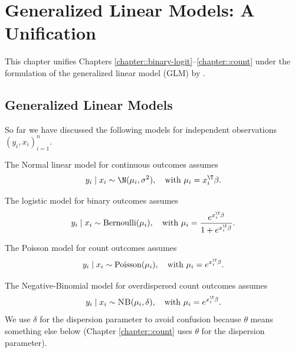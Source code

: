  
\chapter{Generalized Linear Models: A Unification}


This chapter unifies Chapters \ref{chapter::binary-logit}--\ref{chapter::count} under the formulation of the generalized linear model (GLM) by \citet{nelder1972generalized}. 



\section{Generalized Linear Models}

So far we have discussed the following models for independent observations
$(y_{i},x_{i})_{i=1}^{n}$.

\begin{example}\label{eg::gaussianlinearmodel}
The Normal linear model for continuous outcomes assumes
\begin{equation}
y_{i}\mid x_{i}\sim\N(\mu_{i},\sigma^{2}),\quad\text{with }\mu_{i}=x_{i}^{\T}\beta.\label{eq:gaussianlinearmodel}
\end{equation}
\end{example}


\begin{example}\label{eg::binarylogisticmodel}
The logistic model for binary outcomes assumes
\begin{equation}
y_{i}\mid x_{i}\sim\textup{Bernoulli}(\mu_{i}),\quad\text{with }\mu_{i}=\frac{e^{x_{i}^{\T}\beta}}{1+e^{x_{i}^{\T}\beta}} . \label{eq:logisticlinearmodel}
\end{equation}
\end{example}


\begin{example}\label{eg::countpoissonmodel}
The Poisson model for count outcomes assumes 
\begin{equation}
y_{i}\mid x_{i}\sim\textup{Poisson}(\mu_{i}),\quad\text{with }\mu_{i}=e^{x_{i}^{\T}\beta} . \label{eq:poissonlinearmodel}
\end{equation}
\end{example}


\begin{example}\label{eg::countnbmodel}
The Negative-Binomial model for overdispersed count outcomes assumes
\begin{equation}
y_{i}\mid x_{i}\sim\textsc{NB}(\mu_{i},\delta),\quad\text{with }\mu_{i}=e^{x_{i}^{\T}\beta} . \label{eq: nblinearmodel}
\end{equation}
We use $\delta$ for the dispersion parameter to avoid
confusion because $\theta$ means something else below (Chapter \ref{chapter::count} uses $\theta$ for the dispersion parameter). 
\end{example}

